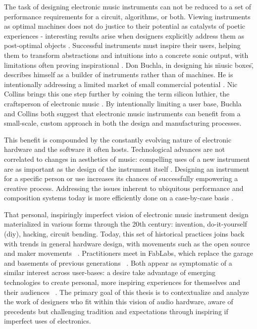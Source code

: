 The task of designing electronic music instruments can not be reduced to a set of performance requirements for a circuit, algorithms, or both. Viewing instruments as optimal machines does not do justice to their potential as catalysts of poetic experiences - interesting results arise when designers explicitly address them as post-optimal objects \citep{dunne2005}. Successful instruments must inspire their users, helping them to transform abstractions and intuitions into a concrete sonic output, with limitations often proving inspirational \citep{evens2005,rovan2009}. Don Buchla, in designing his \"music boxes\", describes himself as a builder of instruments rather than of machines. He is intentionally addressing a limited market of small commercial potential \citep{pinch2001}. Nic Collins brings this one step further by coining the term silicon luthier, the craftsperson of electronic music \citep{collins2008}. By intentionally limiting a user base, Buchla and Collins both suggest that electronic music instruments can benefit from a small-scale, custom approach in both the design and manufacturing processes. 

This benefit is compounded by the constantly evolving nature of electronic hardware and the software it often hosts. Technological advances are not correlated to changes in aesthetics of music: compelling uses of a new instrument are as important as the design of the instrument itself \citep{braun2000}. Designing an instrument for a specific person or use increases its chances of successfully empowering a creative process. Addressing the issues inherent to ubiquitous performance and composition systems today is more efficiently done on a case-by-case basis \citep{armstrong2006,haslett2005}. 

That personal, inspiringly imperfect vision of electronic music instrument design materialized in various forms through the 20th century: invention, do-it-yourself (diy), hacking, circuit bending. Today, this set of historical practices joins back with trends in general hardware design, with movements such as the open source and maker movements ~\citep{mellis2014,perner2011}. Practitioners meet in FabLabs, which replace the garage and basements of previous generations ~\citep{mellis2011}. Both appear as symptomatic of a similar interest across user-bases: a desire take advantage of emerging technologies to create personal, more inspiring experiences for themselves and their audiences ~\citep{hermans2014}. The primary goal of this thesis is to contextualize and analyze the work of designers who fit within this vision of audio hardware, aware of precedents but challenging tradition and expectations through inspiring if imperfect uses of electronics.

